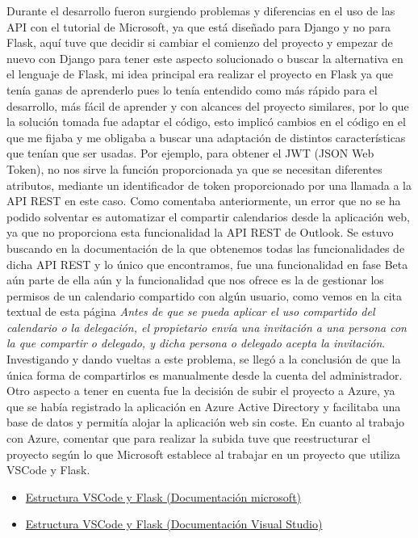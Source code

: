Durante el desarrollo fueron surgiendo problemas y diferencias en el uso de las API con el tutorial de Microsoft, ya que está diseñado para Django y no para Flask, aquí tuve que decidir si cambiar el comienzo del proyecto y empezar de nuevo con Django para tener este aspecto solucionado o buscar la alternativa en el lenguaje de Flask, mi idea principal era realizar el proyecto en Flask ya que tenía ganas de aprenderlo pues lo tenía entendido como más rápido para el desarrollo, más fácil de aprender y con alcances del proyecto similares, por lo que la solución tomada fue adaptar el código, esto implicó cambios en el código en el que me fijaba y me obligaba a buscar una adaptación de distintos características que tenían que ser usadas. Por ejemplo, para obtener el JWT (JSON Web Token), no nos sirve la función proporcionada ya que se necesitan diferentes atributos, mediante un identificador de token  proporcionado por una llamada a la API REST en este caso.\newline
Como comentaba anteriormente, un error que no se ha podido solventar es automatizar el compartir calendarios desde la aplicación web, ya que no proporciona esta funcionalidad la API REST de Outlook. Se estuvo buscando en la documentación de la que obtenemos todas las funcionalidades de dicha API REST y lo único que encontramos, fue una funcionalidad en fase Beta aún parte de ella aún y la funcionalidad que nos ofrece es la de gestionar los permisos de un calendario compartido con algún usuario, como vemos en la cita textual de esta página \textit{Antes de que se pueda aplicar el uso compartido del calendario o la delegación, el propietario envía una invitación a una persona con la que compartir o delegado, y dicha persona o delegado acepta la invitación}\cite{compartirCalendario}. Investigando y dando vueltas a este problema, se llegó a la conclusión de que la única forma de compartirlos es manualmente desde la cuenta del administrador.\newline
Otro aspecto a tener en cuenta fue la decisión de subir el proyecto a Azure, ya que se había registrado la aplicación en Azure Active Directory y facilitaba una base de datos y permitía alojar la aplicación web sin coste.\newline
En cuanto al trabajo con Azure, comentar que para realizar la subida tuve que reestructurar el proyecto según lo que Microsoft establece al trabajar en un proyecto que utiliza VSCode y Flask.
\begin{itemize}
    \item \href{https://github.com/microsoft/python-sample-vscode-flask-tutorial}{Estructura VSCode y Flask (Documentación microsoft)}\cite{pythonSample}
    \item \href{https://code.visualstudio.com/docs/python/tutorial-flask}{Estructura VSCode y Flask (Documentación Visual Studio)}\cite{flaskTutorialVSCode}
\end{itemize}
